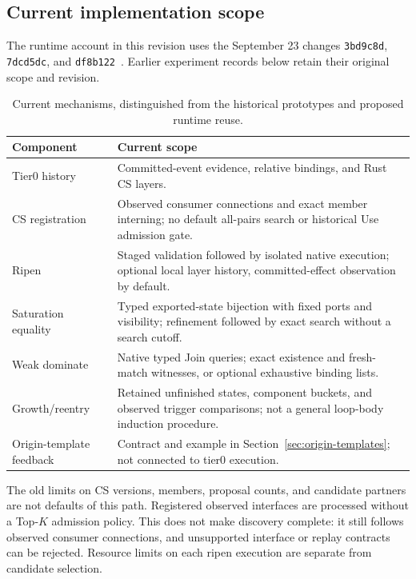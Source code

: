 \documentclass[11pt,a4paper]{article}
\newcommand{\code}[1]{\texttt{#1}}
\begin{document}
\subsection{Current implementation scope}
The runtime account in this revision uses the September 23 changes
\code{3bd9c8d}, \code{7dcd5dc}, and \code{df8b122}~\cite{runtime}.
Earlier experiment records below retain their original scope and revision.
\begin{table}[!htbp]\centering\small
\begin{tabularx}{\linewidth}{@{}p{.25\linewidth}X@{}}
\toprule Component & Current scope \\
\midrule
Tier0 history & Committed-event evidence, relative bindings, and Rust CS layers.\\
CS registration & Observed consumer connections and exact member interning;
no default all-pairs search or historical Use admission gate.\\
Ripen & Staged validation followed by isolated native execution;
optional local layer history, committed-effect observation by default.\\
Saturation equality & Typed exported-state bijection with fixed ports and
visibility; refinement followed by exact search without a search cutoff.\\
Weak dominate & Native typed Join queries; exact existence and fresh-match
witnesses, or optional exhaustive binding lists.\\
Growth/reentry & Retained unfinished states, component buckets, and observed
trigger comparisons; not a general loop-body induction procedure.\\
Origin-template feedback & Contract and example in Section~\ref{sec:origin-templates};
not connected to tier0 execution.\\
\bottomrule
\end{tabularx}
\caption{Current mechanisms, distinguished from the historical prototypes and
proposed runtime reuse.}
\label{tab:implementation}
\end{table}

The old limits on CS versions, members, proposal counts, and candidate partners
are not defaults of this path. Registered observed interfaces are processed
without a Top-$K$ admission policy. This does not make discovery complete: it
still follows observed consumer connections, and unsupported interface or replay
contracts can be rejected. Resource limits on each ripen execution are separate
from candidate selection.
\end{document}

